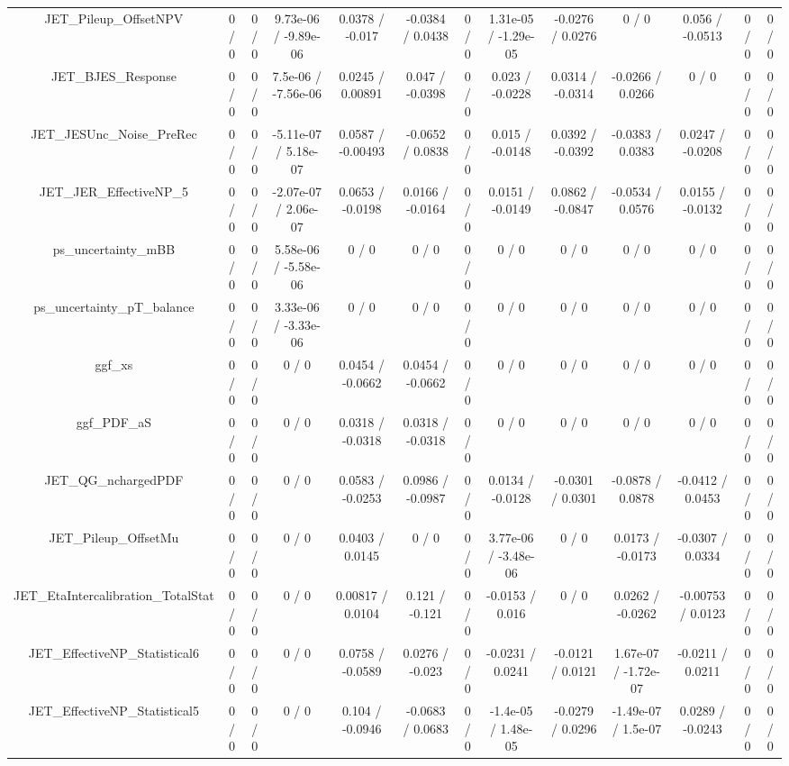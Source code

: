 \documentclass[10pt]{article}
\begin{document}
\begin{table}[htbp]
\begin{center}
\begin{tabular}{|c|c|c|c|c|c|c|c|c|c|c|c|c|}
  JET_Pileup_OffsetNPV & 0 / 0 & 0 / 0 & 9.73e-06 / -9.89e-06 & 0.0378 / -0.017 & -0.0384 / 0.0438 & 0 / 0 & 1.31e-05 / -1.29e-05 & -0.0276 / 0.0276 & 0 / 0 & 0.056 / -0.0513 & 0 / 0 & 0 / 0 \\ 
  JET_BJES_Response & 0 / 0 & 0 / 0 & 7.5e-06 / -7.56e-06 & 0.0245 / 0.00891 & 0.047 / -0.0398 & 0 / 0 & 0.023 / -0.0228 & 0.0314 / -0.0314 & -0.0266 / 0.0266 & 0 / 0 & 0 / 0 & 0 / 0 \\ 
  JET_JESUnc_Noise_PreRec & 0 / 0 & 0 / 0 & -5.11e-07 / 5.18e-07 & 0.0587 / -0.00493 & -0.0652 / 0.0838 & 0 / 0 & 0.015 / -0.0148 & 0.0392 / -0.0392 & -0.0383 / 0.0383 & 0.0247 / -0.0208 & 0 / 0 & 0 / 0 \\ 
  JET_JER_EffectiveNP_5 & 0 / 0 & 0 / 0 & -2.07e-07 / 2.06e-07 & 0.0653 / -0.0198 & 0.0166 / -0.0164 & 0 / 0 & 0.0151 / -0.0149 & 0.0862 / -0.0847 & -0.0534 / 0.0576 & 0.0155 / -0.0132 & 0 / 0 & 0 / 0 \\ 
  ps_uncertainty_mBB & 0 / 0 & 0 / 0 & 5.58e-06 / -5.58e-06 & 0 / 0 & 0 / 0 & 0 / 0 & 0 / 0 & 0 / 0 & 0 / 0 & 0 / 0 & 0 / 0 & 0 / 0 \\ 
  ps_uncertainty_pT_balance & 0 / 0 & 0 / 0 & 3.33e-06 / -3.33e-06 & 0 / 0 & 0 / 0 & 0 / 0 & 0 / 0 & 0 / 0 & 0 / 0 & 0 / 0 & 0 / 0 & 0 / 0 \\ 
  ggf_xs & 0 / 0 & 0 / 0 & 0 / 0 & 0.0454 / -0.0662 & 0.0454 / -0.0662 & 0 / 0 & 0 / 0 & 0 / 0 & 0 / 0 & 0 / 0 & 0 / 0 & 0 / 0 \\ 
  ggf_PDF_aS & 0 / 0 & 0 / 0 & 0 / 0 & 0.0318 / -0.0318 & 0.0318 / -0.0318 & 0 / 0 & 0 / 0 & 0 / 0 & 0 / 0 & 0 / 0 & 0 / 0 & 0 / 0 \\ 
  JET_QG_nchargedPDF & 0 / 0 & 0 / 0 & 0 / 0 & 0.0583 / -0.0253 & 0.0986 / -0.0987 & 0 / 0 & 0.0134 / -0.0128 & -0.0301 / 0.0301 & -0.0878 / 0.0878 & -0.0412 / 0.0453 & 0 / 0 & 0 / 0 \\ 
  JET_Pileup_OffsetMu & 0 / 0 & 0 / 0 & 0 / 0 & 0.0403 / 0.0145 & 0 / 0 & 0 / 0 & 3.77e-06 / -3.48e-06 & 0 / 0 & 0.0173 / -0.0173 & -0.0307 / 0.0334 & 0 / 0 & 0 / 0 \\ 
  JET_EtaIntercalibration_TotalStat & 0 / 0 & 0 / 0 & 0 / 0 & 0.00817 / 0.0104 & 0.121 / -0.121 & 0 / 0 & -0.0153 / 0.016 & 0 / 0 & 0.0262 / -0.0262 & -0.00753 / 0.0123 & 0 / 0 & 0 / 0 \\ 
  JET_EffectiveNP_Statistical6 & 0 / 0 & 0 / 0 & 0 / 0 & 0.0758 / -0.0589 & 0.0276 / -0.023 & 0 / 0 & -0.0231 / 0.0241 & -0.0121 / 0.0121 & 1.67e-07 / -1.72e-07 & -0.0211 / 0.0211 & 0 / 0 & 0 / 0 \\ 
  JET_EffectiveNP_Statistical5 & 0 / 0 & 0 / 0 & 0 / 0 & 0.104 / -0.0946 & -0.0683 / 0.0683 & 0 / 0 & -1.4e-05 / 1.48e-05 & -0.0279 / 0.0296 & -1.49e-07 / 1.5e-07 & 0.0289 / -0.0243 & 0 / 0 & 0 / 0 \\ 

\end{tabular}
\end{center}
\end{table}
\end{document}
